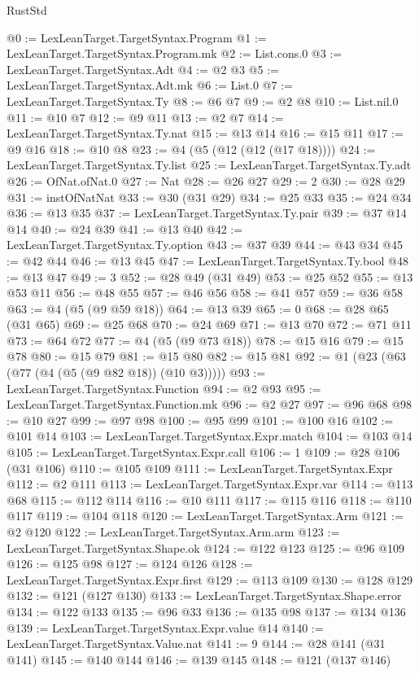 \begin{lexlean}{RustStd}
\begin{coremodule}
@0 := LexLeanTarget.TargetSyntax.Program
@1 := LexLeanTarget.TargetSyntax.Program.mk
@2 := List.cons.{0}
@3 := LexLeanTarget.TargetSyntax.Adt
@4 := @2 @3
@5 := LexLeanTarget.TargetSyntax.Adt.mk
@6 := List.{0}
@7 := LexLeanTarget.TargetSyntax.Ty
@8 := @6 @7
@9 := @2 @8
@10 := List.nil.{0}
@11 := @10 @7
@12 := @9 @11
@13 := @2 @7
@14 := LexLeanTarget.TargetSyntax.Ty.nat
@15 := @13 @14
@16 := @15 @11
@17 := @9 @16
@18 := @10 @8
@23 := @4 (@5 (@12 (@12 (@17 @18))))
@24 := LexLeanTarget.TargetSyntax.Ty.list
@25 := LexLeanTarget.TargetSyntax.Ty.adt
@26 := OfNat.ofNat.{0}
@27 := Nat
@28 := @26 @27
@29 := 2
@30 := @28 @29
@31 := instOfNatNat
@33 := @30 (@31 @29)
@34 := @25 @33
@35 := @24 @34
@36 := @13 @35
@37 := LexLeanTarget.TargetSyntax.Ty.pair
@39 := @37 @14 @14
@40 := @24 @39
@41 := @13 @40
@42 := LexLeanTarget.TargetSyntax.Ty.option
@43 := @37 @39
@44 := @43 @34
@45 := @42 @44
@46 := @13 @45
@47 := LexLeanTarget.TargetSyntax.Ty.bool
@48 := @13 @47
@49 := 3
@52 := @28 @49 (@31 @49)
@53 := @25 @52
@55 := @13 @53 @11
@56 := @48 @55
@57 := @46 @56
@58 := @41 @57
@59 := @36 @58
@63 := @4 (@5 (@9 @59 @18))
@64 := @13 @39
@65 := 0
@68 := @28 @65 (@31 @65)
@69 := @25 @68
@70 := @24 @69
@71 := @13 @70
@72 := @71 @11
@73 := @64 @72
@77 := @4 (@5 (@9 @73 @18))
@78 := @15 @16
@79 := @15 @78
@80 := @15 @79
@81 := @15 @80
@82 := @15 @81
@92 := @1 (@23 (@63 (@77 (@4 (@5 (@9 @82 @18)) (@10 @3)))))
@93 := LexLeanTarget.TargetSyntax.Function
@94 := @2 @93
@95 := LexLeanTarget.TargetSyntax.Function.mk
@96 := @2 @27
@97 := @96 @68
@98 := @10 @27
@99 := @97 @98
@100 := @95 @99
@101 := @100 @16
@102 := @101 @14
@103 := LexLeanTarget.TargetSyntax.Expr.match
@104 := @103 @14
@105 := LexLeanTarget.TargetSyntax.Expr.call
@106 := 1
@109 := @28 @106 (@31 @106)
@110 := @105 @109
@111 := LexLeanTarget.TargetSyntax.Expr
@112 := @2 @111
@113 := LexLeanTarget.TargetSyntax.Expr.var
@114 := @113 @68
@115 := @112 @114
@116 := @10 @111
@117 := @115 @116
@118 := @110 @117
@119 := @104 @118
@120 := LexLeanTarget.TargetSyntax.Arm
@121 := @2 @120
@122 := LexLeanTarget.TargetSyntax.Arm.arm
@123 := LexLeanTarget.TargetSyntax.Shape.ok
@124 := @122 @123
@125 := @96 @109
@126 := @125 @98
@127 := @124 @126
@128 := LexLeanTarget.TargetSyntax.Expr.first
@129 := @113 @109
@130 := @128 @129
@132 := @121 (@127 @130)
@133 := LexLeanTarget.TargetSyntax.Shape.error
@134 := @122 @133
@135 := @96 @33
@136 := @135 @98
@137 := @134 @136
@139 := LexLeanTarget.TargetSyntax.Expr.value @14
@140 := LexLeanTarget.TargetSyntax.Value.nat
@141 := 9
@144 := @28 @141 (@31 @141)
@145 := @140 @144
@146 := @139 @145
@148 := @121 (@137 @146)

\end{coremodule}
\end{lexlean}
